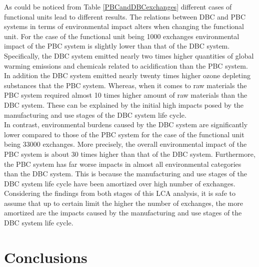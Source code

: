 \documentclass[3p,times,procedia]{elsarticle}
\begin{document}
As could be noticed from Table \ref{PBCandDBCexchanges} different cases of functional units lead to different results. The relations between DBC and PBC systems in terms of environmental impact alters when changing the functional unit. For the case of the functional unit being 1000 exchanges environmental impact of the PBC system is slightly lower than that of the DBC system. Specifically, the DBC system emitted nearly two times higher quantities of global warming emissions and chemicals  related to acidification than the PBC system. In addition the DBC system emitted nearly twenty times higher ozone depleting substances that the PBC system. Whereas, when it comes to raw materials the PBC system required almost 10 times higher amount of raw materials than the DBC system. These can be explained by the initial high impacts posed by the manufacturing and use stages of the DBC system life cycle.\\

In contrast, environmental burdens caused by the DBC system are significantly lower compared to those of the PBC system for the case of the functional unit being 33000 exchanges. More precisely, the overall environmental impact of the PBC system is about 30 times higher than that of the DBC system. Furthermore, the PBC system has far worse impacts in almost all environmental categories than the DBC system. This is because the manufacturing and use stages of the DBC system life cycle have been amortized over high number of exchanges. Considering the findings from both stages of this LCA analysis, it is safe to assume that up to certain limit the higher the number of exchanges, the more amortized are the impacts caused by the manufacturing and use stages of the DBC system life cycle.

\section{Conclusions}
\end{document}
